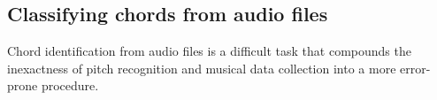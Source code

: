 \subsection{Classifying chords from audio files}

Chord identification from audio files is a difficult task that compounds the inexactness of pitch recognition and musical data collection into a more error-prone procedure.